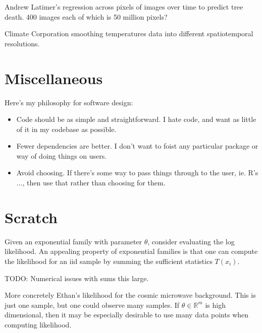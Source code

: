 \documentclass[12pt]{article}
\begin{document}
Andrew Latimer's regression across pixels of images over time to predict
tree death. 400 images each of which is 50 million pixels?

Climate Corporation smoothing temperatures data into different
spatiotemporal resolutions.

\section{Miscellaneous}

Here's my philosophy for software design:

\begin{itemize}
    \item Code should be as simple and straightforward. I hate code, and want as
        little of it in my codebase as possible.
    \item Fewer dependencies are better. I don't want to foist any
        particular package or way of doing things on users.
    \item Avoid choosing. If there's some way to pass things through to the
        user, ie. R's $\dots$, then use that rather than choosing for them.
\end{itemize}

\section{Scratch}

Given an exponential family with parameter $\theta$, consider evaluating
the log likelihood. An appealing property of exponential families is that
one can compute the likelihood for an iid sample by summing the
sufficient statistics $T(x_i)$.

TODO: Numerical issues with sums this large.

More concretely Ethan's likelihood for the cosmic microwave background. 
This is just one sample, but one could observe many samples.
If $\theta \in \mathbb{R}^m$ is high dimensional, then it may be
especially desirable to use many data points when computing likelihood.
\end{document}
